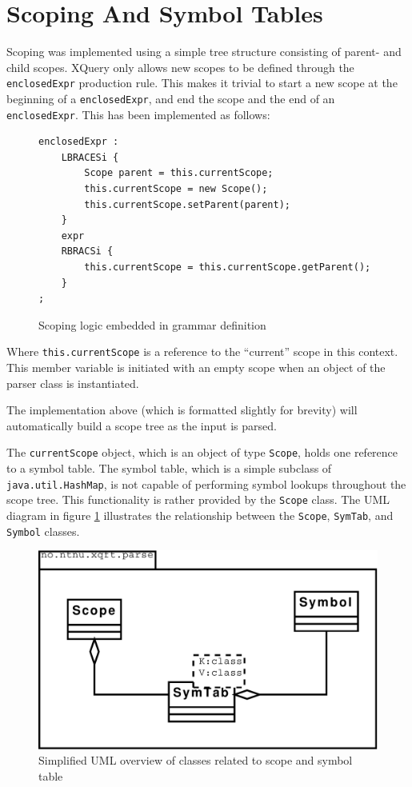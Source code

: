 \section{Scoping And Symbol Tables}
\label{sect:impl:scoping_and_symtab}
Scoping was implemented using a simple tree structure consisting of parent- and
child scopes. XQuery only allows new scopes to be defined through the
\verb!enclosedExpr! production rule. This makes it trivial to start a new scope at the
beginning of a \verb!enclosedExpr!, and end the scope and the end of an \verb!enclosedExpr!.
This has been implemented as follows:
\begin{figure}[h!]
\begin{Verbatim}
enclosedExpr : 
    LBRACESi {
        Scope parent = this.currentScope; 
        this.currentScope = new Scope(); 
        this.currentScope.setParent(parent); 
    }
    expr 
    RBRACSi { 
        this.currentScope = this.currentScope.getParent(); 
    }
;
\end{Verbatim}
\caption{Scoping logic embedded in grammar definition}
\end{figure}

Where \verb!this.currentScope! is a reference to the ``current'' scope in this
context. This member variable is initiated with an empty scope when an object
of the parser class is instantiated.

The implementation above (which is formatted slightly for brevity) will
automatically build a scope tree as the input is parsed.

The \verb!currentScope! object, which is an object of type \verb!Scope!, holds one reference
to a symbol table. The symbol table, which is a simple subclass of
\verb!java.util.HashMap!, is not capable of performing symbol lookups throughout the
scope tree. This functionality is rather provided by the \verb!Scope! class. The UML diagram
in figure \ref{fig:scope:uml1} illustrates the relationship between the
\verb!Scope!, \verb!SymTab!, and \verb!Symbol! classes.
\begin{figure}[h!]
  \centering
    \includegraphics[scale=0.4]{diagrams/uml}
  \caption[Scope and symtab UML diagram]{Simplified UML overview of classes related to
  scope and symbol table}
  \label{fig:scope:uml1}
\end{figure}

